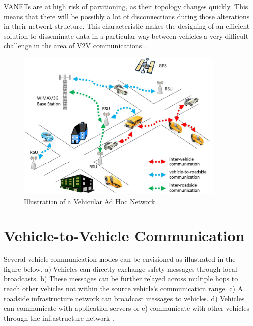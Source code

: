 \documentclass[12pt]{report}
\begin{document}
VANETs are at high risk of partitioning, as their topology changes quickly. This means that there will be possibly a lot of disconnections during those alterations in their network structure. This characteristic makes the designing of an efficient solution to disseminate data in a particular way between vehicles a very difficult challenge in the area of V2V communications \cite{protocols}. 

\begin{figure}[!hb]
	\includegraphics[width=0.9\textwidth]{VANET.jpg}
	\caption{Illustration of a Vehicular Ad Hoc Network \cite{readiness}}
	\label{fig}
\end{figure}

\section{Vehicle-to-Vehicle Communication}
Several vehicle communication modes can be envisioned as illustrated in the figure below. 
a) Vehicles can directly exchange safety messages through local broadcasts. b) These messages can be further relayed across multiple hops to reach other vehicles not within the source vehicle’s communication range. c) A roadside infrastructure network can broadcast messages to vehicles. d) Vehicles can communicate with application servers or e) communicate with other vehicles through the infrastructure network \cite{protocols}.
\end{document}
